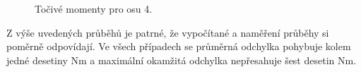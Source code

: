 \begin{figure}[!h]
  \centering
  \hfill
  \caption{Točivé momenty pro osu 4.}
  \label{osa4_prub}
\end{figure}

Z výše uvedených průběhů je patrné, že vypočítané a naměření průběhy si poměrně odpovídají. Ve všech případech se průměrná odchylka pohybuje kolem jedné desetiny Nm a maximální okamžitá odchylka nepřesahuje šest desetin Nm. 

 